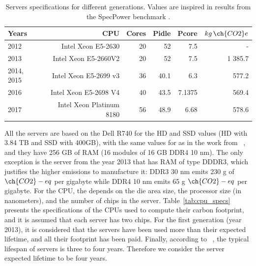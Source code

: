 \begin{table}[h]
  \small
  \caption{Servers specifications for different generations. Values are inspired in results from the SpecPower benchmark \cite{spec_2014,spec_2017,spec_2016,spec_2013}.} \centering
  \label{tab:servers_specs} 
  \begin{tabular}{|l|r|r|r|r|r|}
  \hline    
  \textbf{Years} & \textbf{CPU} &   \textbf{Cores} & \textbf{Pidle}  & \textbf{Pcore}  & \textbf{$kg\,\ch{CO2}e$}  \\
  \hline
   2012     & Intel Xeon E5-2630 & 20 & 52 & 7.5  & -            \\
  \hline
   2013    & Intel Xeon E5-2660V2 & 20 & 52 & 7.5  & 1 385.7     \\
  \hline
   2014, 2015 & Intel Xeon E5-2699 v3 & 36 & 40.1 & 6.3  & 577.2  \\
  \hline
  2016   & Intel Xeon E5-2698 V4 &  40 & 43.5 & 7.1375  & 569.4  \\
  \hline
  2017  & Intel Xeon Platinum 8180 & 56 & 48.9 & 6.68  & 578.6   \\
  \hline  
\end{tabular}  
\end{table}

All the servers are based on the Dell R740 for the HD and SSD values (HD with 3.84 TB and SSD with 400GB), with the same values for  as in the work from ~\citet{gupta2022_ACT}, and they have 256 GB of RAM (16 modules of 16 GB DDR4 10 nm). The only exception is the server from the year 2013 that has RAM of type DDDR3, which justifies the higher emissions to manufacture it:  DDR3 30 nm emits 230 g of $\ch{CO2}-eq$ per gigabyte while DDR4 10 nm emits 65 g $\ch{CO2}-eq$ per gigabyte.   For the CPU, the  depends on the die area size, the processor size (in nanometers), and the number of chips in the server. Table~\ref{tab:cpu_specs} presents the specifications of the CPUs used to compute their carbon footprint, and it is assumed that each server has two chips. For the first generation (year 2013), it is considered that the servers have been used more than their expected lifetime, and all their  footprint has been paid. Finally, according to ~\citet{datacenter_as_computer}, the typical lifespan of servers is three to four years. Therefore we consider the server expected lifetime to be four years.


